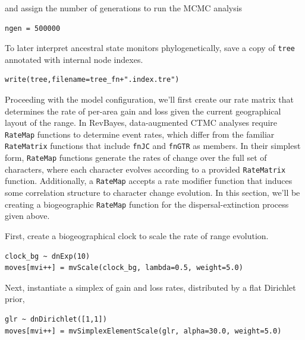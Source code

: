 and assign the number of generations to run the MCMC analysis

\begin{snugshade}
\begin{lstlisting}
ngen = 500000
\end{lstlisting}
\end{snugshade}

To later interpret ancestral state monitors phylogenetically, save a copy of {\tt tree} annotated with internal node indexes.

\begin{snugshade}
\begin{lstlisting}
write(tree,filename=tree_fn+".index.tre")
\end{lstlisting}
\end{snugshade}

Proceeding with the model configuration, we'll first create our rate matrix that determines the rate of per-area gain and loss given the current geographical layout of the range.
In RevBayes, data-augmented CTMC analyses require {\tt RateMap} functions to determine event rates, which differ from the familiar {\tt RateMatrix} functions that include {\tt fnJC} and {\tt fnGTR} as members.
In their simplest form, {\tt RateMap} functions generate the rates of change over the full set of characters, where each character evolves according to a provided {\tt RateMatrix} function.
Additionally, a {\tt RateMap} accepts a rate modifier function that induces some correlation structure to character change evolution.
In this section, we'll be creating a biogeographic {\tt RateMap} function for the dispersal-extinction process given above.

First, create a biogeographical clock to scale the rate of range evolution.

\begin{snugshade}
\begin{lstlisting}
clock_bg ~ dnExp(10)
moves[mvi++] = mvScale(clock_bg, lambda=0.5, weight=5.0)
\end{lstlisting}
\end{snugshade}

Next, instantiate a simplex of gain and loss rates, distributed by a flat Dirichlet prior,

\begin{snugshade}
\begin{lstlisting}
glr ~ dnDirichlet([1,1])
moves[mvi++] = mvSimplexElementScale(glr, alpha=30.0, weight=5.0)
\end{lstlisting}
\end{snugshade}


